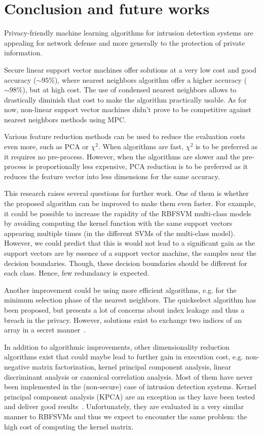 \chapter{Conclusion and future works}
Privacy-friendly machine learning algorithms for intrusion detection systems are appealing for network defense and more generally to the protection of private information.

Secure linear support vector machines offer solutions at a very low cost and good accuracy ($\sim 95\%$), where nearest neighbors algorithm offer a higher accuracy ($\sim 98\%$), but at high cost. The use of condensed nearest neighbors allows to drastically diminish that cost to make the algorithm practically usable. As for now, non-linear support vector machines didn't prove to be competitive against nearest neighbors methods using MPC.

Various feature reduction methods can be used to reduce the evaluation costs even more, such as PCA or $\chi^2$. When algorithms are fast, $\chi^2$ is to be preferred as it requires no pre-process. However, when the algorithms are slower and the pre-process is proportionally less expensive, PCA reduction is to be preferred as it reduces the feature vector into less dimensions for the same accuracy.

This research raises several questions for further work. One of them is whether the proposed algorithm can be improved to make them even faster. For example, it could be possible to increase the rapidity of the RBFSVM multi-class models by avoiding computing the kernel function with the same support vectors appearing multiple times (in the different SVMs of the multi-class model). However, we could predict that this is would not lead to a significant gain as the support vectors are by essence of a support vector machine, the samples near the decision boundaries. Though, these decision boundaries should be different for each class. Hence, few redundancy is expected.

Another improvement could be using more efficient algorithms, e.g. for the minimum selection phase of the nearest neighbors. The quickselect algorithm has been proposed, but presents a lot of concerns about index leakage and thus a breach in the privacy. However, solutions exist to exchange two indices of an array in a secret manner~\cite{Aly2014SecurelyProblems}.

In addition to algorithmic improvements, other dimensionality reduction algorithms exist that could maybe lead to further gain in execution cost, e.g. non-negative matrix factorization, kernel principal component analysis, linear discriminant analysis or canonical correlation analysis. Most of them have never been implemented in the (non-secure) case of intrusion detection systems. Kernel principal component analysis (KPCA) are an exception as they have been tested and deliver good results~\cite{Elkhadir2016IntrusionMethods}. Unfortunately, they are evaluated in a very similar manner to RBFSVMs and thus we expect to encounter the same problem: the high cost of computing the kernel matrix.

